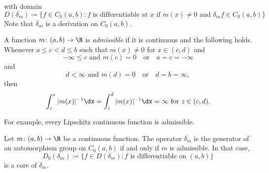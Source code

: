 with domain  
\[
D(\delta_{m}) \coloneq \{ f \in C_{0}(a,b) \colon f \text{ is differentiable at } x \text{ if } m(x) \neq 0 \text{ and } \delta_{m}f \in C_{0}(a,b) \}
\]
Note that $\delta_{m}$ is a derivation on $C_{0}(a,b)$.
\begin{definition}\label{def:b2-3.16}
%
A function $m \colon (a,b) \to \R$ is \emph{admissible} if it is continuous and the following holds.
Whenever $a \leq c < d \leq b$ such that $m(x) \neq 0$ for $x \in (c,d)$ and 
\[
 -\infty \leq c \text{ and } m(c) = 0
\quad \text{or} \quad
a = c = -\infty
\]
and
\[
d < \infty \text{ and } m(d) = 0
\quad \text{or} \quad
d = b = \infty, 
\]
then
\begin{equation*}\label{eq:b2-3.16-KGK.1}
\int_{c}^{z} |m(x)|^{-1} \dx = \int_{z}^{d} |m(x)|^{-1} \dx 
	= \infty \text{ for } z \in (c,d).
\end{equation*}
\end{definition}
For example, every Lipschitz continuous function is admissible.
%
\begin{theorem}\label{thm:b2-3.17}
Let $m \colon (a,b) \to \R$ be a continuous function. The operator $\delta_{m}$
is the generator of an automorphism group on $C_{0}(a,b)$ if and only if\/ $m$
is admissible. In that case,
\[
    D_{0}(\delta_{m}) \coloneq \{ f \in D(\delta_{m}) : f \text{ is differentiable on } (a,b)\}
\]
is a core of\/ $\delta_{m}$.
\end{theorem}
